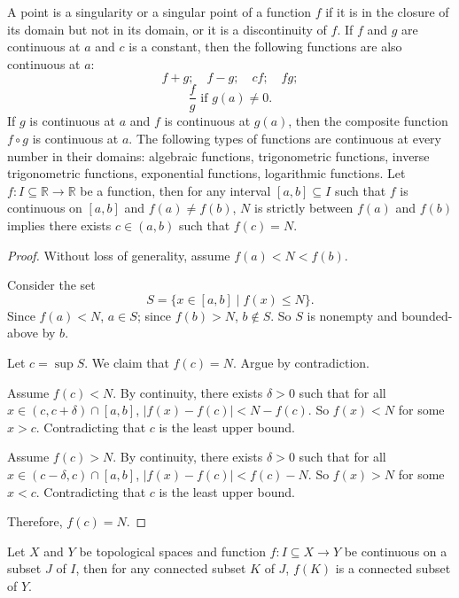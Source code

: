 \documentclass[a4paper,12pt]{report}
\begin{document}
\begin{itemize}
\begin{itemize}
A point is a singularity or a singular point of a function $f$ if it is in the closure of its domain but not in its domain, or it is a discontinuity of $f$.
If $f$ and $g$ are continuous at $a$ and $c$ is a constant, then the following functions are also continuous at $a$:
\[f+g;\quad f-g;\quad cf;\quad fg;\]
\[\frac{f}{g}\text{\ if\ }g(a)\neq 0.\]
If $g$ is continuous at $a$ and $f$ is continuous at $g(a)$, then the composite function $f\circ g$ is continuous at $a$.
The following types of functions are continuous at every number in their domains: algebraic functions, trigonometric functions, inverse trigonometric functions, exponential functions, logarithmic functions.
Let $f\colon I\subseteq\mathbb{R}\to\mathbb{R}$ be a function, then for any interval $[a,b]\subseteq I$ such that $f$ is continuous on $[a,b]$ and $f(a)\neq f(b)$, $N$ is strictly between $f(a)$ and $f(b)$ implies there exists $c\in (a,b)$ such that $f(c)=N$.
\begin{proof}
Without loss of generality, assume $f(a)<N<f(b)$.

Consider the set
\[S=\{x\in [a,b]\mid f(x)\leq N\}.\]
Since $f(a)<N$, $a\in S$; since $f(b)>N$, $b\notin S$. So $S$ is nonempty and bounded-above by $b$.

Let $c=\sup S$. We claim that $f(c)=N$. Argue by contradiction.

Assume $f(c)<N$. By continuity, there exists $\delta>0$ such that for all $x\in (c,c+\delta)\cap [a,b]$, $|f(x)-f(c)|<N-f(c)$. So $f(x)<N$ for some $x>c$. Contradicting that $c$ is the least upper bound.

Assume $f(c)>N$. By continuity, there exists $\delta>0$ such that for all $x\in (c-\delta,c)\cap [a,b]$, $|f(x)-f(c)|<f(c)-N$. So $f(x)>N$ for some $x<c$. Contradicting that $c$ is the least upper bound.

Therefore, $f(c)=N$.
\end{proof}
Let $X$ and $Y$ be topological spaces and function $f\colon I\subseteq X\to Y$ be continuous on a subset $J$ of $I$, then for any connected subset $K$ of $J$, $f(K)$ is a connected subset of $Y$.


\end{itemize}
\end{itemize}
\end{document}
